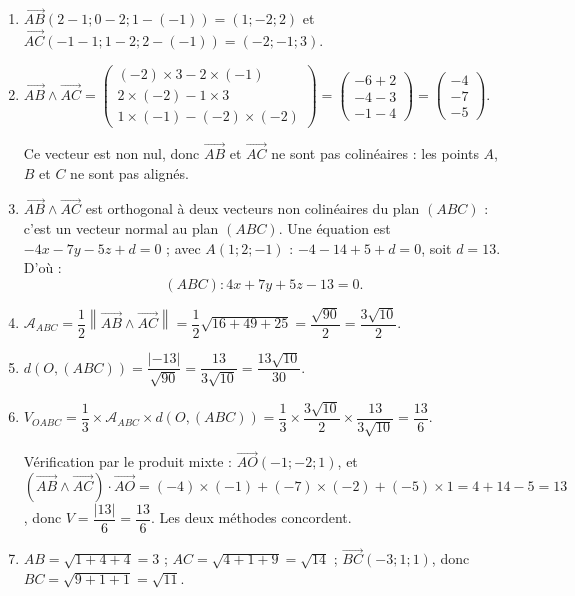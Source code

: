 \documentclass[11pt]{article}
\begin{document}
\begin{corrige}
\begin{enumerate}
\item $\overrightarrow{AB}(2-1 ; 0-2 ; 1-(-1)) = (1 ; -2 ; 2)$ et $\overrightarrow{AC}(-1-1 ; 1-2 ; 2-(-1)) = (-2 ; -1 ; 3)$.
\item $\overrightarrow{AB} \wedge \overrightarrow{AC} = \begin{pmatrix} (-2)\times 3 - 2\times(-1) \\ 2\times(-2) - 1\times 3 \\ 1\times(-1) - (-2)\times(-2) \end{pmatrix} = \begin{pmatrix} -6+2 \\ -4-3 \\ -1-4 \end{pmatrix} = \begin{pmatrix} -4 \\ -7 \\ -5 \end{pmatrix}$.

Ce vecteur est non nul, donc $\overrightarrow{AB}$ et $\overrightarrow{AC}$ ne sont pas colinéaires : les points $A$, $B$ et $C$ ne sont pas alignés.
\item $\overrightarrow{AB} \wedge \overrightarrow{AC}$ est orthogonal à deux vecteurs non colinéaires du plan $(ABC)$ : c'est un vecteur normal au plan $(ABC)$. Une équation est $-4x - 7y - 5z + d = 0$ ; avec $A(1 ; 2 ; -1)$ : $-4 - 14 + 5 + d = 0$, soit $d = 13$. D'où :
\[ (ABC) : 4x + 7y + 5z - 13 = 0. \]
\item $\mathcal{A}_{ABC} = \dfrac{1}{2}\left\|\overrightarrow{AB} \wedge \overrightarrow{AC}\right\| = \dfrac{1}{2}\sqrt{16 + 49 + 25} = \dfrac{\sqrt{90}}{2} = \dfrac{3\sqrt{10}}{2}$.
\item $d(O, (ABC)) = \dfrac{|{-13}|}{\sqrt{90}} = \dfrac{13}{3\sqrt{10}} = \dfrac{13\sqrt{10}}{30}$.
\item $V_{OABC} = \dfrac{1}{3} \times \mathcal{A}_{ABC} \times d(O, (ABC)) = \dfrac{1}{3} \times \dfrac{3\sqrt{10}}{2} \times \dfrac{13}{3\sqrt{10}} = \dfrac{13}{6}$.

Vérification par le produit mixte : $\overrightarrow{AO}(-1 ; -2 ; 1)$, et $\left(\overrightarrow{AB} \wedge \overrightarrow{AC}\right) \cdot \overrightarrow{AO} = (-4)\times(-1) + (-7)\times(-2) + (-5)\times 1 = 4 + 14 - 5 = 13$, donc $V = \dfrac{|13|}{6} = \dfrac{13}{6}$. Les deux méthodes concordent.
\item $AB = \sqrt{1 + 4 + 4} = 3$ ; $AC = \sqrt{4 + 1 + 9} = \sqrt{14}$ ; $\overrightarrow{BC}(-3 ; 1 ; 1)$, donc $BC = \sqrt{9 + 1 + 1} = \sqrt{11}$.


\end{enumerate}
\end{corrige}
\end{document}
